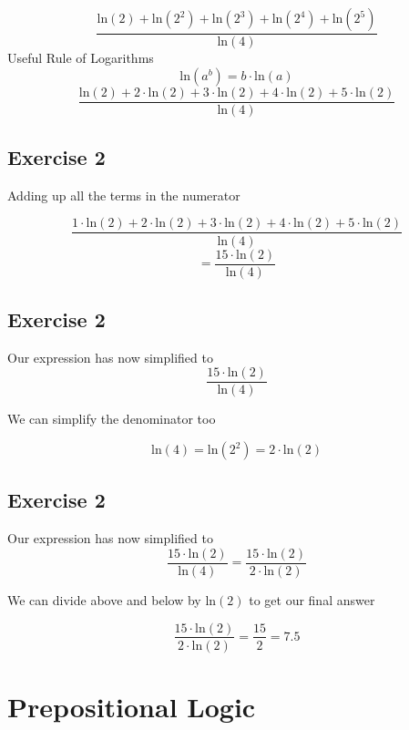 \documentclass[]{report}
\begin{document}
\[  \frac{\mbox{ln}(2) + \mbox{ln}(2^2) + \mbox{ln}(2^3)  + \mbox{ln}(2^4) + \mbox{ln}(2^5)  }  {\mbox{ln}(4)}  \]
Useful Rule of Logarithms
\[  \mbox{ln}(a^b)  = b\cdot \mbox{ln}(a)  \]
\[  \frac{\mbox{ln}(2) + 2 \cdot \mbox{ln}(2) + 3 \cdot\mbox{ln}(2)  + 4 \cdot \mbox{ln}(2) + 5 \cdot \mbox{ln}(2)  }  {\mbox{ln}(4)}  \]
\subsection{Exercise 2}

Adding up all the terms in the numerator

\[  \frac{1\cdot\mbox{ln}(2) + 2 \cdot \mbox{ln}(2) + 3 \cdot\mbox{ln}(2)  + 4 \cdot \mbox{ln}(2) + 5 \cdot \mbox{ln}(2)  }  {\mbox{ln}(4)} \]  \[= \frac{15 \cdot \mbox{ln}(2) }{\mbox{ln}(4)} \]



\subsection{Exercise 2}

Our expression has now simplified to 
\[\frac{15 \cdot \mbox{ln}(2) }{\mbox{ln}(4)} \]

We can simplify the denominator too

\[ \mbox{ln}(4) =  \mbox{ln}(2^2) = 2 \cdot \mbox{ln}(2) \]



\subsection{Exercise 2}

Our expression has now simplified to 
\[\frac{15 \cdot \mbox{ln}(2) }{\mbox{ln}(4)} = \frac{15 \cdot \mbox{ln}(2) }{2 \cdot \mbox{ln}(2)} \]

We can divide above and below by $\mbox{ln}(2)$ to get our final answer


\[ \frac{15 \cdot \mbox{ln}(2) }{2 \cdot \mbox{ln}(2)} = \frac{15}{2} = 7.5 \]


\section*{Prepositional Logic}
\end{document}
